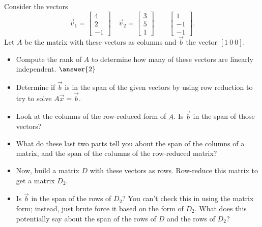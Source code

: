 \documentclass{ximera}
\begin{document}
\begin{exercise}\label{ex:MatReductions}%
    Consider the vectors
    \begin{equation*}
        \vec{v}_1 = \begin{bmatrix} 4 \\ 2 \\ -1 \end{bmatrix} \quad \vec{v}_2 = \begin{bmatrix} 3 \\ 5 \\ 1 \end{bmatrix} \qquad \begin{bmatrix} 1 \\ -1 \\ -1 \end{bmatrix}. 
    \end{equation*}
    Let $A$ be the matrix with these vectors as columns and $\vec{b}$ the vector $[1\ 0 \ 0]$. 
    \begin{itemize}
        \item Compute the rank of $A$ to determine how many of these vectors are linearly independent. $\answer{2}$
        \item Determine if $\vec{b}$ is in the span of the given vectors by using row reduction to try to solve $A\vec{x} = \vec{b}$.
        \begin{multipleChoice}
        \end{multipleChoice}
        \item Look at the columns of the row-reduced form of $A$. Is $\vec{b}$ in the span of those vectors?
        \begin{multipleChoice}
        \end{multipleChoice}
        \item What do these last two parts tell you about the span of the columns of a matrix, and the span of the columns of the row-reduced matrix?
        \item Now, build a matrix $D$ with these vectors as rows. Row-reduce this matrix to get a matrix $D_2$. 
        \item Is $\vec{b}$ in the span of the rows of $D_2$? You can't check this in using the matrix form; instead, just brute force it based on the form of $D_2$. What does this potentially say about the span of the rows of $D$ and the rows of $D_2$?
    \end{itemize}
\end{exercise}
\end{document}
